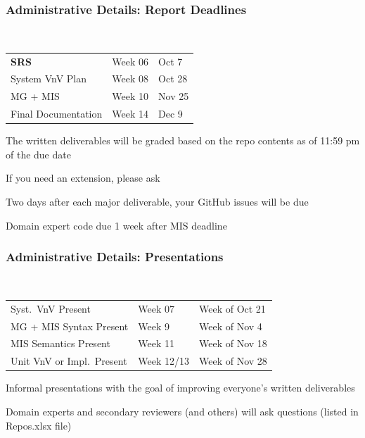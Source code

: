\documentclass[t,12pt,numbers,fleqn]{beamer}
\begin{document}
\begin{frame}
\frametitle{Administrative Details: Report Deadlines}
~\newline
\begin{tabular}{l l l}
\textbf{SRS} & Week 06 & Oct 7\\
System VnV Plan & Week 08 & Oct 28\\
MG + MIS & Week 10 & Nov 25\\
Final Documentation & Week 14 & Dec 9\\
\end {tabular}

\bi
\item The written deliverables will be graded based on the repo contents as of
11:59 pm of the due date
\item If you need an extension, please ask
\item Two days after each major deliverable, your GitHub issues will be due
\item Domain expert code due 1 week after MIS deadline
\ei

\end{frame}


\begin{frame}
\frametitle{Administrative Details: Presentations}

~\newline
\begin{tabular}{l l l}
Syst.\ VnV Present & Week 07 & Week of Oct 21\\
MG + MIS Syntax Present & Week 9 & Week of Nov 4\\
MIS Semantics Present & Week 11 & Week of Nov 18\\
Unit VnV or Impl.\ Present & Week 12/13 & Week of Nov 28\\
\end {tabular}

\bi
\item Informal presentations with the goal of improving everyone's written
  deliverables
\item Domain experts and secondary reviewers (and others) will ask questions
  (listed in Repos.xlsx file)
\ei

\end{frame}

\end{document}

